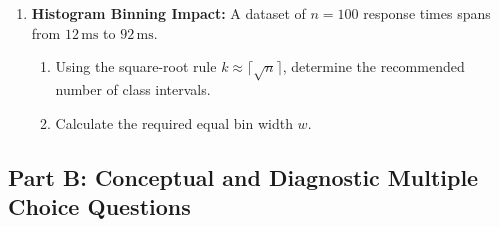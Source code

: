 \begin{enumerate}
    \item \textbf{Histogram Binning Impact:} A dataset of $n = 100$ response times spans from $12\,\text{ms}$ to $92\,\text{ms}$.
    \begin{enumerate}
        \item Using the square-root rule $k \approx \lceil\sqrt{n}\rceil$, determine the recommended number of class intervals.
        \item Calculate the required equal bin width $w$.
    \end{enumerate}
\end{enumerate}

\subsection*{Part B: Conceptual and Diagnostic Multiple Choice Questions}

